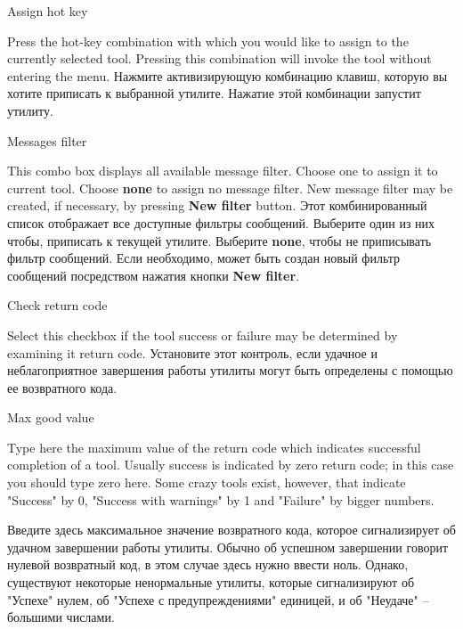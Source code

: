 \begin{popup}
\caption{Assign hot key}

\ifenglish
Press the hot-key combination with which you would like to assign to the
currently selected tool. Pressing this combination will invoke the tool without
entering the menu.
 \else
Нажмите активизирующую комбинацию клавиш, которую вы хотите приписать к 
выбранной утилите. Нажатие этой комбинации запустит утилиту. 
 \fi
\end{popup}

\begin{popup}
\caption{Messages filter}

\ifenglish
This combo box displays all available message filter. Choose one to assign it
to current tool. Choose {\bf none} to assign no message filter.
New message filter may be created, if necessary, by pressing {\bf New filter}
button.
  \else
Этот комбинированный список отображает все доступные фильтры сообщений. Выберите
один из них чтобы, приписать к текущей утилите. Выберите {\bf none}, чтобы не
приписывать фильтр сообщений. Если необходимо, может быть создан новый фильтр
сообщений посредством нажатия кнопки {\bf New filter}.
  \fi
\end{popup}

\begin{popup}
\caption{Check return code}

\ifenglish
Select this checkbox if the tool success or failure may be determined by
examining it return code.
 \else
Установите этот контроль, если удачное и неблагоприятное завершения работы
утилиты могут быть определены с помощью ее возвратного кода.
 \fi
\end{popup}

\begin{popup}
\caption{Max good value}

\ifenglish
Type here the maximum value of the return code which indicates successful
completion of a tool. Usually success is indicated by zero return code;
in this case you should type zero here. Some crazy tools exist, however,
that indicate "Success" by 0, "Success with warnings" by 1 and "Failure"
by bigger numbers.

 \else
Введите здесь максимальное значение возвратного кода, которое сигнализирует об 
удачном завершении работы утилиты. Обычно об успешном завершении говорит
нулевой возвратный код, в этом случае здесь нужно ввести ноль. Однако, существуют 
некоторые ненормальные утилиты, которые сигнализируют об "Успехе" нулем, об
"Успехе с предупреждениями" единицей, и об "Неудаче" -- большими числами.
 \fi
\end{popup}


